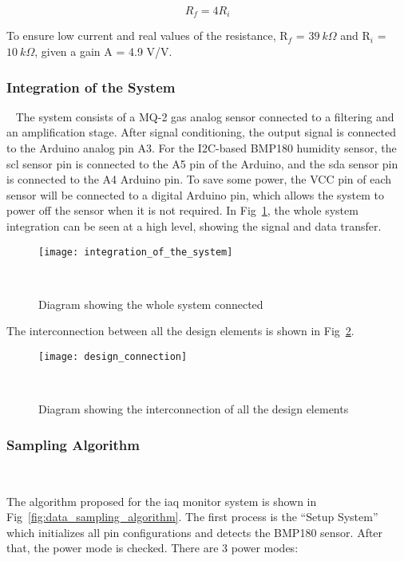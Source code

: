 \begin{equation}
    R_{f} = 4 R_{i}
\end{equation}

To ensure low current and real values of the resistance, R$_{f}$ = $39~k\Omega$ and R$_{i}$ = $10~k\Omega$, given a gain A = 4.9 V/V.



\subsubsection{Integration of the System}
~\label{sec:methodology:dev_methodology:iots}
\hspace{8pt}
The system consists of a MQ-2 gas analog sensor connected to a filtering and an amplification stage. After signal conditioning, the output signal is connected to the Arduino analog pin A3. For the I2C-based BMP180 humidity sensor, the \acrfull{scl} sensor pin is connected to the A5 pin of the Arduino, and the \acrfull{sda} sensor pin is connected to the A4 Arduino pin. To save some power, the VCC pin of each sensor will be connected to a digital Arduino pin, which allows the system to power off the sensor when it is not required. In Fig~\ref{fig:integration_of_the_system}, the whole system integration can be seen at a high level, showing the signal and data transfer.

\begin{figure}[H]
    \centering
    \texttt{[image: integration\_of\_the\_system]}
    \caption{Diagram showing the whole system connected}
~\label{fig:integration_of_the_system}
\end{figure}

The interconnection between all the design elements is shown in Fig~\ref{fig:design_connection}.

\begin{figure}[H]
    \centering
    \texttt{[image: design\_connection]}
    \caption{Diagram showing the interconnection of all the design elements}
~\label{fig:design_connection}
\end{figure}


\subsubsection{Sampling Algorithm}
~\label{sec:methodology:dev_methodology:sa}
\hspace{8pt}

The algorithm proposed for the \acrshort{iaq} monitor system is shown in Fig~\ref{fig:data_sampling_algorithm}. The first process is the ``Setup System'' which initializes all pin configurations and detects the BMP180 sensor. After that, the power mode is checked. There are 3 power modes:

